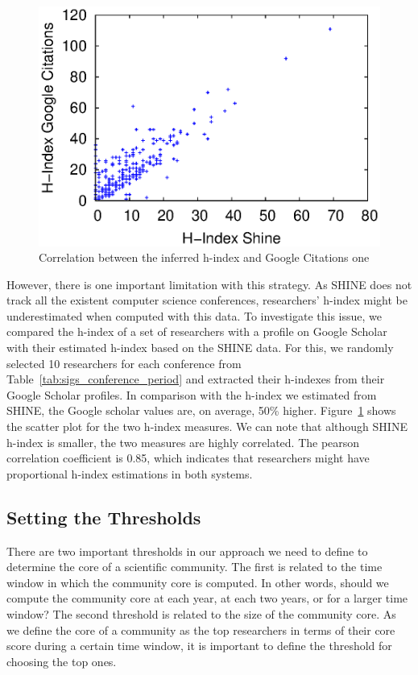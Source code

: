 \begin{figure}[!htb]
\centering
\includegraphics[scale=.5]{graficos/hindex/hindex_scatter_plot.eps}
\caption{Correlation between the inferred h-index and Google Citations one}
\label{fig:hindex_scatter_plot}
\end{figure}


However, there is one important limitation with this strategy.  As SHINE does not track all the existent computer science conferences, researchers' h-index might be underestimated when computed
with this data. To investigate this issue, we compared the h-index of a set of researchers with a profile on Google Scholar with their estimated h-index based on the SHINE data. For this, we
randomly selected 10 researchers for each conference from Table~\ref{tab:sigs_conference_period} and extracted their h-indexes from their Google Scholar profiles.  In comparison
with the h-index we estimated from SHINE, the Google scholar values are, on average, 50\% higher. Figure~\ref{fig:hindex_scatter_plot} shows the scatter plot for the two h-index
measures. We can note that although SHINE h-index is smaller, the two measures are highly correlated. The pearson correlation coefficient is 0.85, which indicates that researchers
might have proportional h-index estimations in both systems. 

\subsection{Setting the Thresholds}
\label{sub:thresholds}


There are two important thresholds in our approach we need to define to determine the core of a scientific community.  The first is related to the time window in which the 
community core is computed. In other words, should we compute the community core at each year, at each two years, or for a larger time window? The second threshold is related to the
size of the community core. As we define the core of a community as the top researchers in terms of their core score during a certain time window, it is important to define the
threshold for choosing the top ones.

